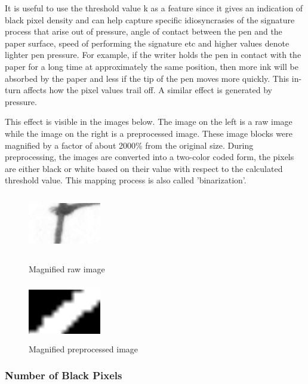 \documentclass{article}
\begin{document}
It is useful to use the threshold value k as a feature since it gives an indication of black pixel density and can help capture specific idiosyncrasies of the signature process that arise out of pressure, angle of contact between the pen and the paper surface, speed of performing the signature etc and higher values denote lighter pen pressure. For example, if the writer holds the pen in contact with the paper for a long time at approximately the same position, then more ink will be absorbed by the paper and less if the tip of the pen moves more quickly. This in-turn affects how the pixel values trail off. A similar effect is generated by pressure.

This effect is visible in the images below. The image on the left is a raw image while the image on the right is a preprocessed image. These image blocks were magnified by a factor of about 2000\% from the original size. During preprocessing, the images are converted into a two-color coded form, the pixels are either black or white based on their value with respect to the calculated threshold value. This mapping process is also called 'binarization'.

\begin{figure}[ht]
    \begin{minipage}[b]{0.5\linewidth}
        \centering
        \includegraphics[width=1.25in, height=1in]{threshold2.png}
        \caption{Magnified raw image}
        \label{fig:figure1}
    \end{minipage}
    \hspace{0.5cm}
    \begin{minipage}[b]{0.5\linewidth}
        \centering
        \includegraphics[width=1.25in, height=1in]{threshold1.png}
        \caption{Magnified preprocessed image}
        \label{fig:figure2}
    \end{minipage}
\end{figure}


\subsubsection{Number of Black Pixels}
\end{document}
